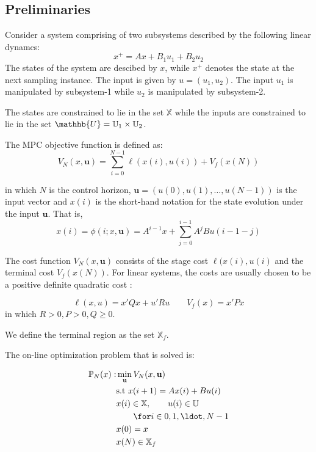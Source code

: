 \documentclass{article}
\newcommand{\bu}{\mathbf{u}}
\theoremstyle{definition}
\begin{document}
\subsection{Preliminaries}
Consider a system comprising of two subsystems described by the following linear dynamcs:
\begin{equation}
\label{eq:model}
x^+ = Ax + B_1 u_1 + B_2 u_2
\end{equation}
The states of the system are descibed by $x$, while $x^+$ denotes the
state at the next sampling instance. The input is given by $u =
(u_1,u_2)$. The input $u_1$ is manipulated by subsystem-1 while $u_2$
is manipulated by subsystem-2.

The states are constrained to lie in the set $\mathbb{X}$ while the
inputs are constrained to lie in the set $\mathhb{U} = \mathbb{U}_1
\times \mathbb{U}_2$. 

The MPC objective function is defined as:
\begin{equation}
\label{eq:VN0}
V_N(x,\bu) = \sum_{i=0}^{N-1}\ell(x(i),u(i)) + V_f(x(N))
\end{equation}

in which $N$ is the control horizon, $\bu = (u(0),u(1),\ldots,u(N-1))$
is the input vector and $x(i)$ is the short-hand notation for the
state evolution under the input $\bu$. That is,
 \[x(i) = \phi(i;x,\bu)=  A^{i-1}x +\sum_{j=0}^{i-1} A^jBu(i-1-j)\]

The cost function $V_N(x,\bu)$ consists of the stage cost
$\ell(x(i),u(i)$ and the terminal cost $V_f(x(N))$. For linear
systems, the costs are usually chosen to be a positive definite
quadratic cost :

\begin{equation}
\label{eq:costs}
\ell(x,u) = x'Qx + u'Ru \qquad V_f(x) = x'Px 
\end{equation}
in which $R>0, P>0,Q \geq 0$.

We define the terminal region as the set $\mathbb{X}_f$.

The on-line optimization problem that is solved is:

\begin{align}

\mathbb{P}_N(x): & \min_{\bu}V_N(x,\bu) \nonumber \\
& \text{s.t~} x(i+1) = Ax(i) + Bu(i) \nonumber\\
& x(i) \in \mathbb{X},\qquad u(i) \in \mathbb{U} \label{eq:PNx} \\
& \qquad \for i \in 0,1,\ldot,N-1 \nonumber\\
& x(0) = x \nonumber \\
& x(N) \in \mathbb{X}_f \nonumber
\end{align}
\end{document}
